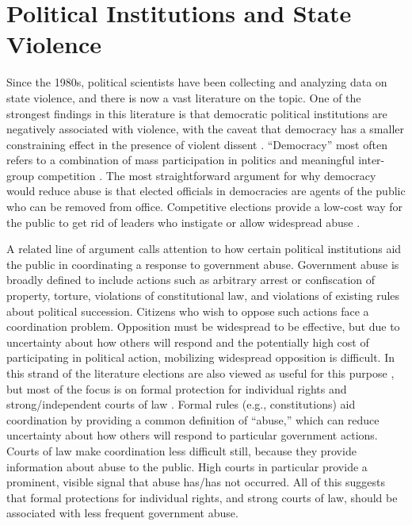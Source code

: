 \documentclass[11pt]{article}
\begin{document}
\section*{Political Institutions and State Violence}

Since the 1980s, political scientists have been collecting and analyzing data on state violence, and there is now a vast literature on the topic. One of the strongest findings in this literature is that democratic political institutions are negatively associated with violence, with the caveat that democracy has a smaller constraining effect in the presence of violent dissent \citep{Davenport2007AR,Davenport2007,DavenportMooreArmstrong2007,ConradMoore2010}. ``Democracy'' most often refers to a combination of mass participation in politics and meaningful inter-group competition \citep{Dahl1971}. The most straightforward argument for why democracy would reduce abuse is that elected officials in democracies are agents of the public who can be removed from office. Competitive elections provide a low-cost way for the public to get rid of leaders who instigate or allow widespread abuse \citep[E.g.,][]{PoeTate1994}.


A related line of argument calls attention to how certain political institutions aid the public in coordinating a response to government abuse. Government abuse is broadly defined to include actions such as arbitrary arrest or confiscation of property, torture, violations of constitutional law, and violations of existing rules about political succession. Citizens who wish to oppose such actions face a coordination problem. Opposition must be widespread to be effective, but due to uncertainty about how others will respond and the potentially high cost of participating in political action, mobilizing widespread opposition is difficult. In this strand of the literature elections are also viewed as useful for this purpose \citep[E.g.,][]{Fearon2011}, but most of the focus is on formal protection for individual rights and strong/independent courts of law \citep{NorthWeingast1989,Weingast1997,Vanberg2005,ElkinsGinsburgMelton2009,PowellStaton2009,Melton2013}. Formal rules (e.g., constitutions) aid coordination by providing a common definition of ``abuse,'' which can reduce uncertainty about how others will respond to particular government actions. Courts of law make coordination less difficult still, because they provide information about abuse to the public. High courts in particular provide a prominent, visible signal that abuse has/has not occurred. All of this suggests that formal protections for individual rights, and strong courts of law, should be associated with less frequent government abuse. 
\end{document}
